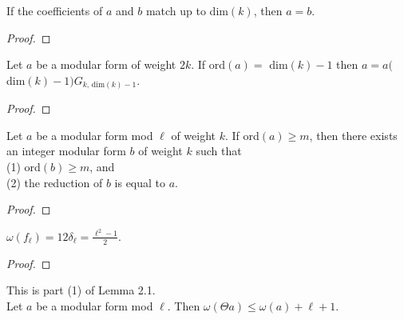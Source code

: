 \begin{theorem}
  \label{thm:coeff_trunc_injective}
  \leanok
  If the coefficients of $a$ and $b$ match up to dim$(k)$, then $a = b$.
\end{theorem}
\begin{proof}
  \leanok
\end{proof}


\begin{theorem}
  \label{thm:eq_G_of_ord_max}
  \leanok
  Let $a$ be a modular form of weight $2k$. If ord$(a) = $ dim$(k) - 1$ then
  $a = a ($dim$(k) - 1) G_{k, \, \text{dim} (k) - 1}.$ 
\end{theorem}
\begin{proof}
  \leanok
\end{proof}



\begin{theorem}
  \label{thm:exists_maximal_Reduce}
  \leanok
  Let $a$ be a modular form mod $\ell$ of weight $k$. If ord$(a) \ge m$, then there exists an
  integer modular form $b$ of weight $k$ such that \\
  (1) ord$(b) \ge m$, and \\
  (2) the reduction of $b$ is equal to $a$.

\end{theorem}
\begin{proof}
  \leanok
\end{proof}



\begin{lemma}
  \label{lem:Filt_fl}
  \leanok
  $ \omega (f_\ell) = 12 \delta_\ell = \frac{\ell^2 - 1}{2}.$
\end{lemma}
\begin{proof}
  \leanok
\end{proof}


\begin{theorem}
  \label{thm:Filt_Theta_bound}
  \leanok
  This is part (1) of Lemma 2.1. \\
  Let $a$ be a modular form mod $\ell$. Then $\omega (\Theta a) \le \omega (a) + \ell + 1$.
\end{theorem}

